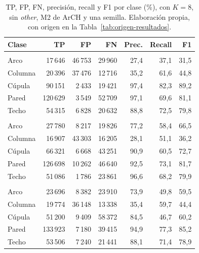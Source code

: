 \begin{table}[!htbp]
\centering
{}\small
\setlength{\tabcolsep}{4pt}
\caption[Falsos positivos y negativos por clase]{TP, FP, FN, precisión, recall y F1 por clase (\%), con $K=8$, sin \emph{other}, M2 de ArCH y una semilla. Elaboración propia, con origen en la Tabla~\ref{tab:origen-resultados}.}
\label{tab:fpfn-clase}
\begin{tabularx}{\linewidth}{@{}>{\raggedright\arraybackslash}Xrrrrrr@{}}
\toprule
\textbf{Clase} & \textbf{TP} & \textbf{FP} & \textbf{FN} & \textbf{Prec.} & \textbf{Recall} & \textbf{F1} \\
\midrule
\multicolumn{7}{@{}l}{\textit{M3, Sonata original}} \\
Arco & 17\,646 & 46\,753 & 29\,960 & 27{,}4 & 37{,}1 & 31{,}5 \\
Columna & 20\,396 & 37\,476 & 12\,716 & 35{,}2 & 61{,}6 & 44{,}8 \\
Cúpula & 90\,151 & 2\,433 & 19\,421 & 97{,}4 & 82{,}3 & 89{,}2 \\
Pared & 120\,629 & 3\,549 & 52\,709 & 97{,}1 & 69{,}6 & 81{,}1 \\
Techo & 54\,315 & 6\,828 & 20\,632 & 88{,}8 & 72{,}5 & 79{,}8 \\
\midrule
\multicolumn{7}{@{}l}{\textit{M4 base}} \\
Arco & 27\,780 & 8\,217 & 19\,826 & 77{,}2 & 58{,}4 & 66{,}5 \\
Columna & 16\,907 & 43\,303 & 16\,205 & 28{,}1 & 51{,}1 & 36{,}2 \\
Cúpula & 66\,321 & 6\,668 & 43\,251 & 90{,}9 & 60{,}5 & 72{,}7 \\
Pared & 126\,698 & 10\,262 & 46\,640 & 92{,}5 & 73{,}1 & 81{,}7 \\
Techo & 51\,086 & 1\,786 & 23\,861 & 96{,}6 & 68{,}2 & 79{,}9 \\
\midrule
\multicolumn{7}{@{}l}{\textit{M4, Sonata original}} \\
Arco & 23\,696 & 8\,382 & 23\,910 & 73{,}9 & 49{,}8 & 59{,}5 \\
Columna & 19\,774 & 36\,148 & 13\,338 & 35{,}4 & 59{,}7 & 44{,}4 \\
Cúpula & 51\,200 & 9\,409 & 58\,372 & 84{,}5 & 46{,}7 & 60{,}2 \\
Pared & 133\,923 & 7\,180 & 39\,415 & 94{,}9 & 77{,}3 & 85{,}2 \\
Techo & 53\,506 & 7\,240 & 21\,441 & 88{,}1 & 71{,}4 & 78{,}9 \\
\bottomrule
\end{tabularx}
\end{table}

